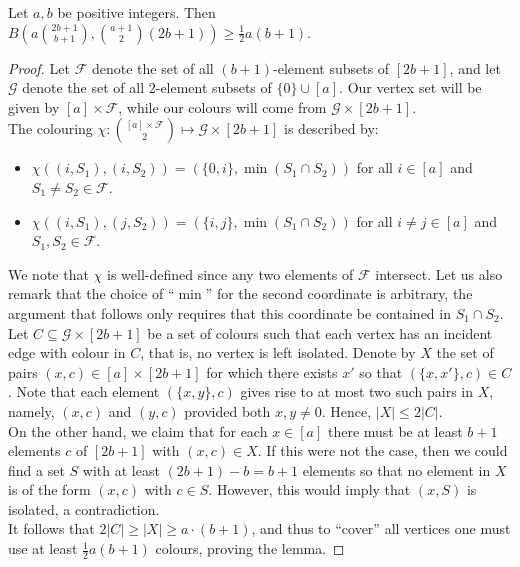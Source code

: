 \documentclass[10pt,a4paper]{amsart}
\begin{document}
\begin{lemma}
\label{lem:3:2}
Let $a, b$ be positive integers. Then $B\left(a\binom{2b+1}{b+1}, \binom{a+1}{2}(2b+1)\right) \geq \frac{1}{2}a(b+1)$.
\end{lemma}

\begin{proof}
Let $\mathcal F$ denote the set of all $(b+1)$-element subsets of $[2b+1]$, and let $\mathcal G$ denote the set of all $2$-element subsets of $\{0\} \cup[a]$.  Our vertex set will be given by $[a] \times \mathcal F$, while our colours will come from $\mathcal G \times [2b+1]$. \\

\noindent
The colouring $\chi : \binom{[a] \times \mathcal F}{2} \mapsto \mathcal G \times [2b+1]$ is described by:
\begin{itemize}
    \item $\chi((i, S_1), (i, S_2)) = (\{0,i\}, \min(S_1 \cap S_2))$ for all $i \in [a]$ and $S_1 \ne S_2 \in \mathcal F$.
    \item $\chi((i, S_1), (j, S_2)) = (\{i,j\}, \min(S_1 \cap S_2))$ for all $i \ne j \in [a]$ and $S_1, S_2 \in \mathcal F$.
\end{itemize}
We note that $\chi$ is well-defined since any two elements of $\mathcal F$ intersect. Let us also remark that the choice of ``$\min$'' for the second coordinate is arbitrary, the argument that follows only requires that this coordinate be contained in $S_1 \cap S_2$. \\

\noindent
Let $C \subseteq \mathcal{G} \times [2b+1]$ be a set of colours such that each vertex has an incident edge with colour in $C$, that is, no vertex is left isolated. Denote by $X$ the set of pairs $(x, c) \in [a] \times [2b+1]$ for which there exists $x'$ so that $(\{x, x'\}, c) \in C$. Note that each element $(\{x, y\}, c)$ gives rise to at most two such pairs in $X$, namely, $(x, c)$ and $(y, c)$ provided both $x, y \ne 0$. Hence, $|X| \leq 2|C|$. \\

\noindent
On the other hand, we claim that for each $x \in [a]$ there must be at least $b+1$ elements $c$ of $[2b+1]$ with $(x,c) \in X$. If this were not the case, then we could find a set $S$ with at least $(2b+1)-b = b+1$ elements so that no element in $X$ is of the form $(x, c)$ with $c \in S$. However, this would imply that $(x, S)$ is isolated, a contradiction. \\

\noindent
It follows that $2|C| \geq |X| \geq a \cdot (b+1)$, and thus to ``cover'' all vertices one must use at least $\frac{1}{2}a(b+1)$ colours, proving the lemma.
\end{proof}
\end{document}
